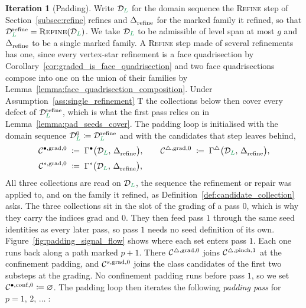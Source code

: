 \documentclass[a4paper, 12pt]{article}
\makeatletter
\newcommand{\robert}[1]{{\color{orange} #1}}
\newcommand{\collectV}{\Gamma^{\bullet}}                         %
\newcommand{\collectF}{\Gamma^{\triangle}}                       %
\newcommand{\collectC}{\Gamma^{s}}                               %
\DeclareRobustCommand{\candV}[1][]{\mathcal{C}^{\bullet\ifx\@empty#1\@empty\else,#1\fi}}
\DeclareRobustCommand{\candF}[1][]{\mathcal{C}^{\triangle\ifx\@empty#1\@empty\else,#1\fi}}
\DeclareRobustCommand{\candC}[1][]{\mathcal{C}^{s\ifx\@empty#1\@empty\else,#1\fi}}
\newcommand{\green}{\color{ForestGreen}}
\DeclareRobustCommand{\simplexsubsetTwo}[2][]{\Delta\ifx\@empty#1\@empty\else^{#1}\fi_{#2}}
\renewcommand{\L}{{\green L}}
\theoremstyle{definition}
\newtheorem{iteration}[theorem]{Iteration}
\theoremstyle{plain}
\numberwithin{equation}{section}
\newcommand{\tobecut}[1]{{\color{red} #1}}     %
\DeclareRobustCommand{\domseq}[1][]{\mathcal{D}\ifx\@empty#1\@empty\else_{#1}\fi}
\makeatother
\begin{document}
\begin{iteration}[Padding]
\label{it:pad_iteration}
    Write $\domseq[\L]$ for the domain sequence the \textsc{Refine} step of Section~\ref{subsec:refine} refines and $\simplexsubsetTwo{\mathrm{refine}}$ for the marked family it refined, so that $\domseq[\L]^{\mathrm{refine}} = \textsc{Refine} ( \domseq[\L] )$. %
    \tobecut{We take $\domseq[\L]$ to be admissible of level span at most $g$ and $\simplexsubsetTwo{\mathrm{refine}}$ to be a single marked family. A \textsc{Refine} step made of several refinements has one, since every vertex-star refinement is a face quadrisection by Corollary~\ref{cor:graded_is_face_quadrisection} and two face quadrisections compose into one on the union of their families by Lemma~\ref{lemma:face_quadrisection_composition}.} \robert{Under Assumption~\ref{ass:single_refinement}} \tobecut{T}\robert{t}he collections below then cover every defect of $\domseq[\L]^{\mathrm{refine}}$, which is what the first pass relies on in Lemma~\ref{lemma:pad_seeds_cover}. The padding loop is initialised with the domain sequence $\domseq[\L]^{0} \coloneq \domseq[\L]^{\mathrm{refine}}$ and with the candidates that step leaves behind,
    \begin{equation}
        \label{eq:pad_initial_seeds}
        \begin{aligned}
            \candV[\mathrm{grad},0] \; &\coloneq \; \collectV \big( \domseq[\L], \, \simplexsubsetTwo{\mathrm{refine}} \big) ,
            \qquad
            \candF[\mathrm{grad},0] \; \coloneq \; \collectF \big( \domseq[\L], \, \simplexsubsetTwo{\mathrm{refine}} \big) , \\[2pt]
            \candC[\mathrm{grad},0] \; &\coloneq \; \collectC \big( \domseq[\L], \, \simplexsubsetTwo{\mathrm{refine}} \big) ,
        \end{aligned}
    \end{equation}
    All three collections are read on $\domseq[\L]$, the sequence the refinement or repair was applied to, and on the family it refined, as Definition~\ref{def:candidate_collection} asks. The three collections sit in the slot of the grading of a pass $0$, which is why they carry the indices $\mathrm{grad}$ and $0$. They then feed pass $1$ through the same seed identities as every later pass, so pass $1$ needs no seed definition of its own. Figure~\ref{fig:padding_signal_flow} shows where each set enters pass $1$. Each one runs back along a path marked $p\!+\!1$. There $\candF[\mathrm{grad},0]$ joins $\candF[\mathrm{pinch},1]$ at the confinement padding, and $\candC[\mathrm{grad},0]$ joins the class candidates of the first two substeps at the grading. No confinement padding runs before pass $1$, so we set $\candV[\mathrm{conf},0] \coloneq \varnothing$. The padding loop then iterates the following \emph{padding pass} for $p = 1, \, 2, \, \ldots \;$:

\end{iteration}
\end{document}
